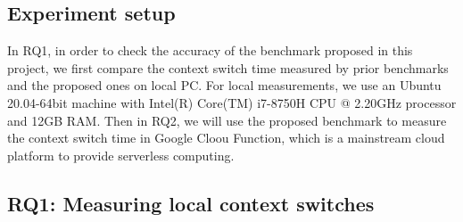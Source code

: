  
\subsection{Experiment setup}

In RQ1, in order to check the accuracy of the benchmark proposed in this project, 
we first compare the context switch time measured by prior benchmarks and the proposed ones on local PC.
For local measurements, we use an Ubuntu 20.04-64bit machine with Intel(R) Core(TM) i7-8750H CPU @ 2.20GHz processor and 12GB RAM.
Then in RQ2, we will use the proposed benchmark to measure the context switch time in Google Cloou Function, 
which is a mainstream cloud platform to provide serverless computing.



\subsection{RQ1: Measuring local context switches}



